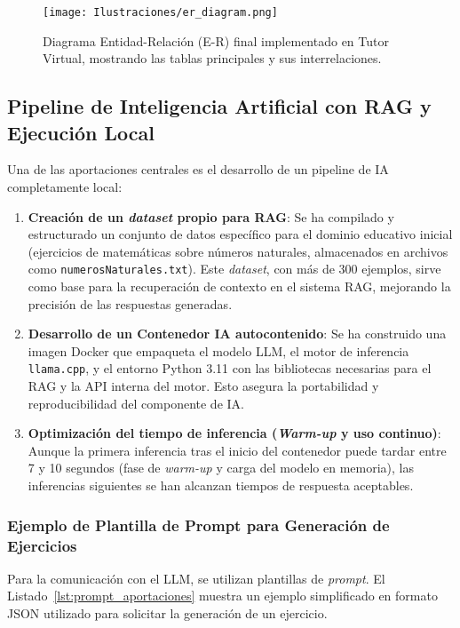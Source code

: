 \begin{figure}[H]
  \centering
  \texttt{[image: Ilustraciones/er\_diagram.png]}
  \caption{Diagrama Entidad-Relación (E-R) final implementado en Tutor Virtual, mostrando las tablas principales y sus interrelaciones.}
  \label{fig:er-diagram}
\end{figure}

\subsection{Pipeline de Inteligencia Artificial con RAG y Ejecución Local}
\label{ssec:pipeline_ia_aportaciones}

Una de las aportaciones centrales es el desarrollo de un pipeline de IA completamente local:
\begin{enumerate}[label=\alph*),leftmargin=*]
  \item \textbf{Creación de un \textit{dataset} propio para RAG}: Se ha compilado y estructurado un conjunto de datos específico para el dominio educativo inicial (ejercicios de matemáticas sobre números naturales, almacenados en archivos como \texttt{numerosNaturales.txt}). Este \textit{dataset}, con más de \SI{300}{} ejemplos, sirve como base para la recuperación de contexto en el sistema RAG, mejorando la precisión de las respuestas generadas.
  \item \textbf{Desarrollo de un Contenedor IA autocontenido}: Se ha construido una imagen Docker que empaqueta el modelo LLM, el motor de inferencia \texttt{llama.cpp}, y el entorno Python 3.11 con las bibliotecas necesarias para el RAG y la API interna del motor. Esto asegura la portabilidad y reproducibilidad del componente de IA.
  \item \textbf{Optimización del tiempo de inferencia (\emph{Warm-up} y uso continuo)}: Aunque la primera inferencia tras el inicio del contenedor puede tardar entre 7 y 10 segundos (fase de \emph{warm-up} y carga del modelo en memoria), las inferencias siguientes se han alcanzan tiempos de respuesta aceptables.
\end{enumerate}

\subsubsection*{Ejemplo de Plantilla de Prompt para Generación de Ejercicios}
\label{sssec:ejemplo_prompt}
Para la comunicación con el LLM, se utilizan plantillas de \emph{prompt}. El Listado~\ref{lst:prompt_aportaciones} muestra un ejemplo simplificado en formato JSON utilizado para solicitar la generación de un ejercicio.

